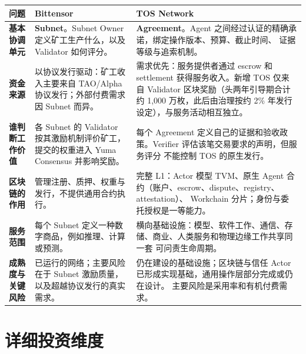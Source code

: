 \documentclass[UTF8,11pt,fontset=fandol]{ctexart}
\begin{document}
\begin{longtable}{P{0.17\textwidth}P{0.36\textwidth}P{0.37\textwidth}}
\toprule
{}
问题 & Bittensor & TOS Network \\
\midrule
\endhead
\textbf{基本协调单元} &
\textbf{Subnet}。Subnet Owner 定义矿工生产什么，以及 Validator 如何评分。 &
\textbf{Agreement}。Agent 之间经过认证的精确承诺，绑定操作版本、预算、截止时间、
证据等级与追索机制。 \\
\textbf{资金来源} &
以协议发行驱动：矿工收入主要来自 TAO/Alpha 协议发行；外部付费需求因 Subnet 而异。 &
需求优先：服务提供者通过 escrow 和 settlement 获得服务收入。新增 TOS 仅来自
Validator 区块奖励（头两年引导期合计约 1,000 万枚，此后由治理按约 2\% 年发行设定），与服务活动相互独立。 \\
\textbf{谁判断工作价值} &
各 Subnet 的 Validator 按其激励机制评价矿工，提交的权重进入 Yuma Consensus 并影响奖励。 &
每个 Agreement 定义自己的证据和验收政策。Verifier 评估该笔交易要求的声明，但服务评分
不能控制 TOS 的原生发行。 \\
\textbf{区块链的作用} &
管理注册、质押、权重与发行，不提供通用合约执行。 &
完整 L1：Actor 模型 TVM、原生 Agent 合约（账户、escrow、dispute、registry、attestation）、
Workchain 分片；身份与委托授权是一等能力。 \\
\textbf{服务范围} &
每个 Subnet 定义一种数字商品，例如推理、计算或预测。 &
横向基础设施：模型、软件工作、通信、存储、商业、人类服务和物理边缘工作共享同一套
可问责生命周期。 \\
\textbf{成熟度与关键风险} &
已运行的网络；主要风险在于 Subnet 激励质量，以及超越协议发行的真实需求。 &
仍在建设的基础设施；区块链与信任 Actor 已形成实现基础，通用操作层部分完成或仍在设计。
主要风险是采用率和有机付费需求。 \\
\bottomrule
\end{longtable}

\section{详细投资维度}
\end{document}
